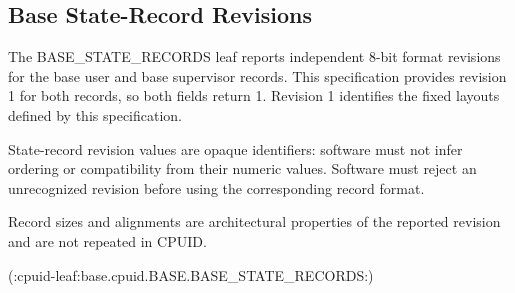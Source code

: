 \subsection{Base State-Record Revisions}

The BASE\_STATE\_RECORDS leaf reports independent 8-bit format revisions for the base user and base supervisor records. This specification provides revision 1 for both records, so both fields return 1. Revision 1 identifies the fixed layouts defined by this specification.

State-record revision values are opaque identifiers: software must not infer ordering or compatibility from their numeric values. Software must reject an unrecognized revision before using the corresponding record format.

Record sizes and alignments are architectural properties of the reported revision and are not repeated in CPUID.

(:cpuid-leaf:base.cpuid.BASE.BASE_STATE_RECORDS:)
